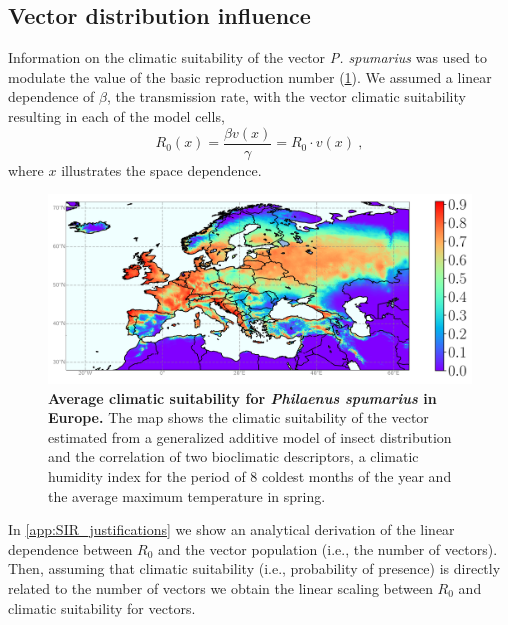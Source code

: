 \subsection{Vector distribution influence}\label{app:vector_influence}

Information on the climatic suitability of the vector \textit{P. spumarius}
\cite{Godefroid2021} was used to modulate the value of the basic reproduction
number (\cref{fig:sup_vector}). We assumed a linear dependence of $\beta$, the
transmission rate, with
the vector climatic suitability resulting in each of the model cells,
\begin{equation}
    R_0(x)=\frac{\beta v(x)}{\gamma}=R_0\cdot v(x) \ ,
\end{equation}
where $x$ illustrates the space dependence.

\begin{figure}[H]
    \centering
    \includegraphics[width=1\textwidth]{Figures/vector_layer.png}
    \caption[Average climatic suitability for \textit{Philaenus
            spumarius} in Europe]{\textbf{Average climatic suitability for
            \textit{Philaenus
                spumarius} in Europe.} The map shows the climatic suitability
        of the vector
        estimated from a generalized additive model of insect distribution and
        the
        correlation of two bioclimatic descriptors, a climatic humidity index
        for the
        period of 8 coldest months of the year and the average maximum
        temperature in
        spring.}
    \label{fig:sup_vector} %
\end{figure}

In \cref{app:SIR_justifications} we show an analytical derivation of the
linear dependence between $R_0$ and the vector population (i.e., the number of
vectors). Then, assuming that climatic suitability (i.e., probability of
presence) is directly related to the number of vectors we obtain the linear
scaling between $R_0$ and climatic suitability for vectors.

